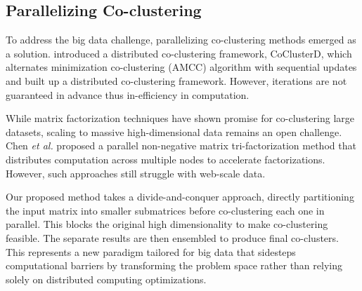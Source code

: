 \subsection{Parallelizing Co-clustering}

To address the big data challenge, parallelizing co-clustering methods emerged as a solution. 
\cite{cheng2015CoClusterDDistributedFramework} introduced a distributed co-clustering framework, CoClusterD, which alternates minimization co-clustering (AMCC) algorithm with sequential updates and built up a distributed co-clustering framework. However, iterations are not guaranteed in advance thus in-efficiency in computation.

While matrix factorization techniques have shown promise for co-clustering large datasets, scaling to massive high-dimensional data remains an open challenge. Chen \textit{et al.}\cite{chen2023ParallelNonNegativeMatrix} proposed a parallel non-negative matrix tri-factorization method that distributes computation across multiple nodes to accelerate factorizations. However, such approaches still struggle with web-scale data.

Our proposed method takes a divide-and-conquer approach, directly partitioning the input matrix into smaller submatrices before co-clustering each one in parallel. This blocks the original high dimensionality to make co-clustering feasible. The separate results are then ensembled to produce final co-clusters. This represents a new paradigm tailored for big data that sidesteps computational barriers by transforming the problem space rather than relying solely on distributed computing optimizations.